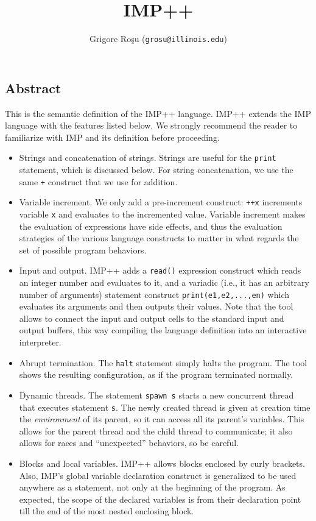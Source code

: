 \setlength{\parindent}{1em}
\title{IMP++}
\author{Grigore Ro\c{s}u (\texttt{grosu@illinois.edu})}

\maketitle

\begin{latexComment}
\section{Abstract}
This is the \K semantic definition of the IMP++ language.
IMP++ extends the IMP language with the features listed below.  We
strongly recommend the reader to familiarize with IMP and its \K
definition before proceeding.
\begin{itemize}
\item Strings and concatenation of strings.  Strings are useful
for the \texttt{print} statement, which is discussed below.  For
string concatenation, we use the same \texttt{+} construct that we use
for addition.
\item Variable increment.  We only add a pre-increment construct:
\texttt{++x} increments variable \texttt{x} and evaluates to the
incremented value.  Variable increment makes the evaluation of
expressions have side effects, and thus the evaluation strategies
of the various language constructs to matter in what regards the set
of possible program behaviors.
\item Input and output.  IMP++ adds a \texttt{read()} expression
construct which reads an integer number and evaluates to it, and 
a variadic (i.e., it has an arbitrary number of arguments) statement
construct \texttt{print(e1,e2,...,en)} which evaluates its arguments
and then outputs their values.  Note that the \K tool allows to
connect the input and output cells to the standard input and output
buffers, this way compiling the language definition into an
interactive interpreter.
\item Abrupt termination.  The \texttt{halt} statement simply halts
the program.  The \K tool shows the resulting configuration, as if the
program terminated normally.
\item Dynamic threads. The statement \texttt{spawn s} starts a new
concurrent thread that executes statement \texttt{s}.  The newly
created thread is given at creation time the {\em environment} of its
parent, so it can access all its parent's variables.  This allows for
the parent thread and the child thread to communicate; it also allows
for races and ``unexpected'' behaviors, so be careful.
\item Blocks and local variables.  IMP++ allows blocks enclosed by 
curly brackets.  Also, IMP's global variable declaration construct is
generalized to be used anywhere as a statement, not only at the
beginning of the program.  As expected, the scope of the declared
variables is from their declaration point till the end of the most
nested enclosing block.
\end{itemize}


\end{latexComment}
